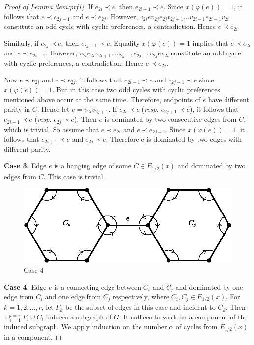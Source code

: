 \documentclass[11pt]{article}
\numberwithin{theorem}{section}
\begin{document}
\begin{proof}[Proof of Lemma \ref{lem:prf1}]
If $e_{2i}\prec e$, then $e_{2i-1}\prec e$. Since $x(\varphi(e))=1$, it follows that $e\prec e_{2j-1}$ and $e\prec e_{2j}$. However, $v_{2i} e v_{2j} e_{2j} v_{2j+1} \ldots v_{2i-1} e_{2i-1} v_{2i}$ constitute an odd cycle with cyclic preferences, a contradiction. Hence $e\prec e_{2i}$.

Similarly, if $e_{2j}\prec e$, then $e_{2j-1}\prec e$. Equality $x(\varphi(e))=1$ implies that $e\prec e_{2i}$ and $e\prec e_{2i-1}$. However, $v_{2i} e_{2i} v_{2i+1} \ldots v_{2j-1} e_{2j-1} v_{2j} e v_{2i}$ constitute an odd cycle with cyclic preferences, a contradiction. Hence $e\prec e_{2j}$.

Now $e\prec e_{2i}$ and $e\prec e_{2j}$, it follows that $e_{2i-1}\prec e$ and $e_{2j-1}\prec e$ since $x(\varphi(e))=1$. But in this case two odd cycles with cyclic preferences mentioned above occur at the same time.
Therefore, endpoints of $e$ have different parity in $C$. Hence let $e=v_{2i} v_{2j+1}$.
If $e_{2i}\prec e$ (\textit{resp.} $e_{2j+1}\prec e$), it follows that $e_{2i-1}\prec e$ (\textit{resp.} $e_{2j}\prec e$). Then $e$ is dominated by two consecutive edges from $C$, which is trivial.  So assume that $e\prec e_{2i}$ and $e\prec e_{2j+1}$. Since $x(\varphi(e))=1$, it follows that $e_{2i+1}\prec e$ and $e_{2j}\prec e$. Therefore e is dominated by two edges with different parity.

\textbf{Case 3.} Edge $e$ is a hanging edge of some $C\in E_{1/2}(x)$ and dominated by two edges from $C$. This case is trivial.

\begin{figure}
\centering
\includegraphics[scale=0.85]{KernelMengerian-fig2}
\caption{Case 4}
\end{figure}
\textbf{Case 4.} Edge $e$ is a connecting edge between $C_i$ and $C_j$ and dominated by one edge from $C_i$ and one edge from $C_j$ respectively, where $C_i, C_j \in E_{1/2}(x)$.
For $k=1,2,\ldots,r$, let $F_k$ be the subset of edges in this case and incident to $C_k$.
Then $\cup_{i=1}^{i=r} F_i\cup C_i$ induces a subgraph of $G$. It suffices to work on a component of the induced subgraph. We apply induction on the number $\alpha$ of cycles from $E_{1/2}(x)$ in a component.


\end{proof}
\end{document}
